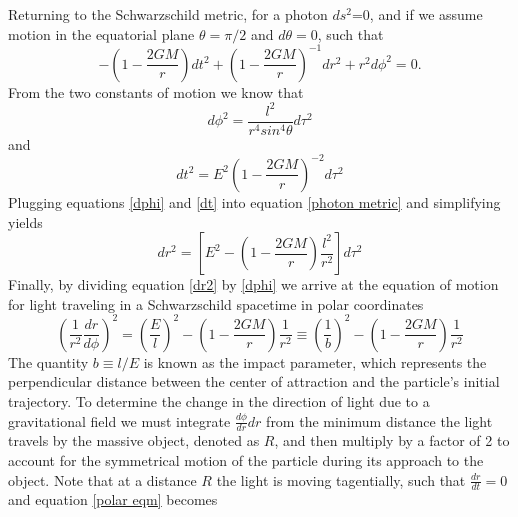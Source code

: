 \documentclass[a4paper,12pt]{article}
\begin{document}
Returning to the Schwarzschild metric, for a photon $ds^2$=0, and if we assume motion in the equatorial plane $\theta=\pi/2$ and $d \theta =0$, such that
\begin{equation} \label{photon metric}
-\left(1-\frac{2GM}{r} \right)dt^2 + \left(1-\frac{2GM}{r} \right)^{-1}dr^2+r^2 d\phi^2=0.
\end{equation}
From the two constants of motion we know that
\begin{equation} \label{dphi}
d\phi^2=\frac{l^2}{r^4 sin^4 \theta} d\tau^2
\end{equation}
and
\begin{equation} \label{dt}
dt^2=E^2\left(1-\frac{2GM}{r}\right)^{-2}d\tau^2
\end{equation}
Plugging equations \ref{dphi} and \ref{dt} into equation \ref{photon metric} and simplifying yields
\begin{equation} \label{dr2}
dr^2= \left[E^2 - \left(1-\frac{2GM}{r}\right) \frac{l^2}{r^2}\right]d\tau^2
\end{equation} 
Finally, by dividing equation \ref{dr2} by \ref{dphi} we arrive at the equation of motion for light traveling in a Schwarzschild spacetime in polar coordinates
\begin{equation} \label{polar eqm}
\left(\frac{1}{r^2} \frac{dr}{d \phi} \right)^2 = \left(\frac{E}{l} \right)^2 - \left(1-\frac{2GM}{r}\right)\frac{1}{r^2} \equiv \left(\frac{1}{b}\right)^2 - \left(1-\frac{2GM}{r}\right)\frac{1}{r^2}
\end{equation}
The quantity $b \equiv l/E$ is known as the impact parameter, which represents the perpendicular distance between the center of attraction and the particle's initial trajectory.  To determine the change in the direction of light due to a gravitational field we must integrate $\frac{d\phi}{dr}dr $ from the minimum distance the light travels by the massive object, denoted as $R$, and then multiply by a factor of 2 to account for the symmetrical motion of the particle during its approach to the object. Note that at a distance $R$ the light is moving tagentially, such that $\frac{dr}{dt}=0$ and equation \ref{polar eqm} becomes
\end{document}
